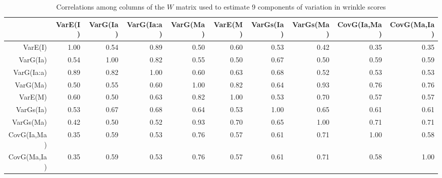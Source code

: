 \begin{landscape}
\begin{table}[ht]
\centering
\caption{Correlations among columns of the $W$ matrix used to estimate 9 components of variation in wrinkle scores}
\label{tab:corre9}
\begin{tabular}{rrrrrrrrrr}
  \hline
 & VarE(I) & VarG(Ia) & VarG(Ia:a) & VarG(Ma) & VarE(M) & VarGs(Ia) & VarGs(Ma) & CovG(Ia,Ma) & CovG(Ma,Ia) \\ 
  \hline
VarE(I) & 1.00 & 0.54 & 0.89 & 0.50 & 0.60 & 0.53 & 0.42 & 0.35 & 0.35 \\ 
  VarG(Ia) & 0.54 & 1.00 & 0.82 & 0.55 & 0.50 & 0.67 & 0.50 & 0.59 & 0.59 \\ 
  VarG(Ia:a) & 0.89 & 0.82 & 1.00 & 0.60 & 0.63 & 0.68 & 0.52 & 0.53 & 0.53 \\ 
  VarG(Ma) & 0.50 & 0.55 & 0.60 & 1.00 & 0.82 & 0.64 & 0.93 & 0.76 & 0.76 \\ 
  VarE(M) & 0.60 & 0.50 & 0.63 & 0.82 & 1.00 & 0.53 & 0.70 & 0.57 & 0.57 \\ 
  VarGs(Ia) & 0.53 & 0.67 & 0.68 & 0.64 & 0.53 & 1.00 & 0.65 & 0.61 & 0.61 \\ 
  VarGs(Ma) & 0.42 & 0.50 & 0.52 & 0.93 & 0.70 & 0.65 & 1.00 & 0.71 & 0.71 \\ 
  CovG(Ia,Ma) & 0.35 & 0.59 & 0.53 & 0.76 & 0.57 & 0.61 & 0.71 & 1.00 & 0.58 \\ 
  CovG(Ma,Ia) & 0.35 & 0.59 & 0.53 & 0.76 & 0.57 & 0.61 & 0.71 & 0.58 & 1.00 \\ 
   \hline
\end{tabular}
\end{table}
\end{landscape}

